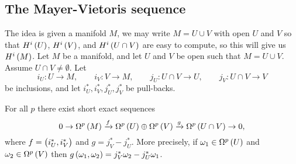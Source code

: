 \pagebreak

\subsection{The Mayer-Vietoris sequence}

The idea is given a manifold $ M $, we may write $ M = U \cup V $ with open $ U $ and $ V $ so that $ H^i\br{U} $, $ H^i\br{V} $, and $ H^i\br{U \cap V} $ are easy to compute, so this will give us $ H^i\br{M} $. Let $ M $ be a manifold, and let $ U $ and $ V $ be open such that $ M = U \cup V $. Assume $ U \cap V \ne \emptyset $. Let
$$ i_U : U \to M, \qquad i_V : V \to M, \qquad j_U : U \cap V \to U, \qquad j_V : U \cap V \to V $$
be inclusions, and let $ i_U^*, i_V^*, j_U^*, j_V^* $ be pull-backs.

\begin{proposition}
\label{prop:2.28}
For all $ p $ there exist short exact sequences
$$ 0 \to \Omega^p\br{M} \xrightarrow{f} \Omega^p\br{U} \oplus \Omega^p\br{V} \xrightarrow{g} \Omega^p\br{U \cap V} \to 0, $$
where $ f = \br{i_U^*, i_V^*} $ and $ g = j_V^* - j_U^* $. More precisely, if $ \omega_1 \in \Omega^p\br{U} $ and $ \omega_2 \in \Omega^p\br{V} $ then $ g\br{\omega_1, \omega_2} = j_V^*\omega_2 - j_U^*\omega_1 $.
\end{proposition}

